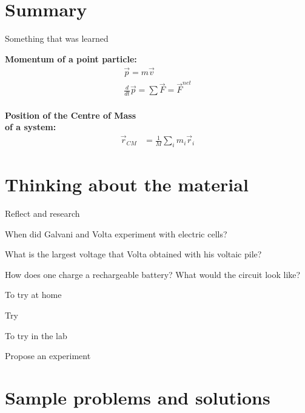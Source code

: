 \newpage
\section{Summary}

\begin{chapterSummary}
 Something that was learned
\end{chapterSummary}

\newpage
\begin{importantEquations}
\medskip
\begin{multicols}{2}
\textbf{Momentum of a point particle:}
\begin{align*}
\vec p = m\vec v \\
\frac{d}{dt}\vec p = \sum \vec F = \vec F^{net}
\end{align*}
\columnbreak
\\
\textbf{Position of the Centre of Mass \\ of a system:}
\begin{align*}
\vec r_{CM} &=\frac{1}{M}\sum_i m_i\vec r_i 
\end{align*}
\medskip
\end{multicols}
\end{importantEquations}

\newpage
\section{Thinking about the material}

\begin{chapteractivity}{Reflect and research}
{
\item When did Galvani and Volta experiment with electric cells?
\item What is the largest voltage that Volta obtained with his voltaic pile?
\item How does one charge a rechargeable battery? What would the circuit look like?
}
\end{chapteractivity}

\begin{chapteractivity}{To try at home}
{
\item Try
}
\end{chapteractivity}

\begin{chapteractivity}{To try in the lab}
{
\item Propose an experiment
}
\end{chapteractivity}

\newpage
\section{Sample problems and solutions}

